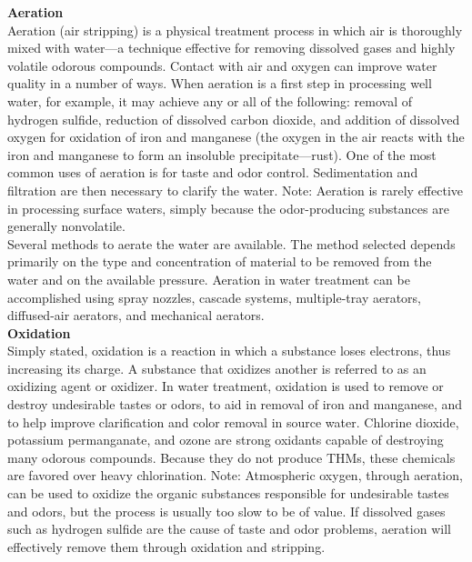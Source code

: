 \textbf{Aeration}\\
Aeration (air stripping) is a physical treatment process in which air is thoroughly mixed with water—a technique effective for removing dissolved gases and highly volatile odorous compounds. Contact with air and oxygen can improve water quality in a number of ways. When aeration is a first step in processing well water, for example, it may achieve any or all of the following: removal of hydrogen sulfide, reduction of dissolved carbon dioxide, and addition of dissolved oxygen for oxidation of iron and manganese (the oxygen in the air reacts with the iron and manganese to form an insoluble precipitate—rust). One of the most common uses of aeration is for taste and odor control. Sedimentation and filtration are then necessary to clarify the water.
Note: Aeration is rarely effective in processing surface waters, simply because the odor-producing substances are generally nonvolatile.\\
Several methods to aerate the water are available. The method selected depends primarily on the type and concentration of material to be removed from the water and on the available pressure. Aeration in water treatment can be accomplished using spray nozzles, cascade systems, multiple-tray aerators, diffused-air aerators, and mechanical aerators.\\


\textbf{Oxidation}\\
Simply stated, oxidation is a reaction in which a substance loses electrons, thus increasing its charge. A substance that oxidizes another is referred to as an oxidizing agent or oxidizer. In water treatment, oxidation is used to remove or destroy undesirable tastes or odors, to aid in removal of iron and manganese, and to help improve clarification and color removal in source water. Chlorine dioxide, potassium permanganate, and ozone are strong oxidants capable of destroying many odorous compounds. Because they do not produce THMs, these chemicals are favored over heavy chlorination.
Note: Atmospheric oxygen, through aeration, can be used to oxidize the organic substances responsible for undesirable tastes and odors, but the process is usually too slow to be of value. If dissolved gases such as hydrogen sulfide are the cause of taste and odor problems, aeration will effectively remove them through oxidation and stripping.

